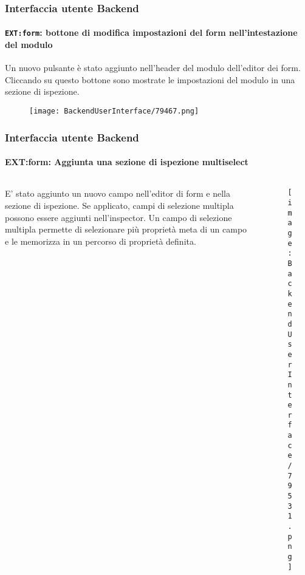 \begin{frame}[fragile]
	\frametitle{Interfaccia utente Backend}
	\framesubtitle{\texttt{EXT:form}: bottone di modifica impostazioni del form nell’intestazione del modulo}

	Un nuovo pulsante è stato aggiunto nell'header del modulo dell'editor dei form.
	Cliccando su questo bottone sono mostrate le impostazioni del modulo in una sezione di ispezione.

	\begin{figure}\vspace{-0.2cm}
		\texttt{[image: BackendUserInterface/79467.png]}
	\end{figure}

\end{frame}

\begin{frame}[fragile]
	\frametitle{Interfaccia utente Backend}
	\framesubtitle{{EXT:form}: Aggiunta una sezione di ispezione multiselect}

	\begin{columns}[T]
		\begin{column}{0.4\textwidth}
			E' stato aggiunto un nuovo campo nell'editor di form e nella sezione di ispezione.
			Se applicato, campi di selezione multipla possono essere aggiunti nell'inspector.
			Un campo di selezione multipla permette di selezionare più proprietà meta di un campo
			e le memorizza in un percorso di proprietà definita.
		\end{column}

		\begin{column}{0.6\textwidth}
			\begin{figure}\vspace*{-0.6cm}
				\texttt{[image: BackendUserInterface/79531.png]}
			\end{figure}
		\end{column}
	\end{columns}

\end{frame}

